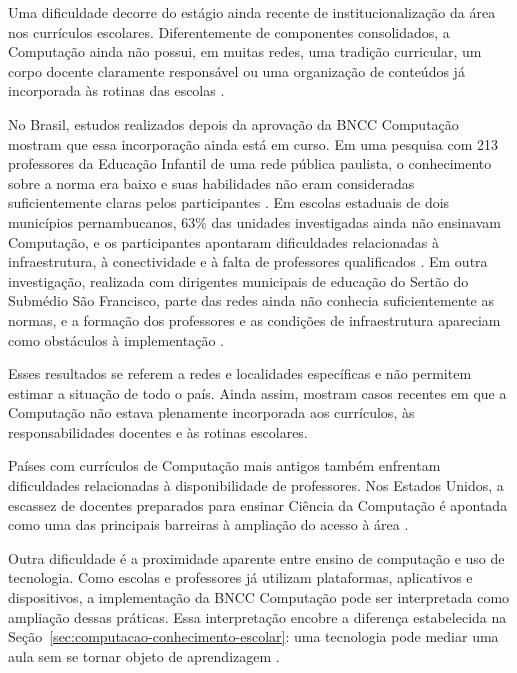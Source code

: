Uma dificuldade decorre do estágio ainda recente de institucionalização da área nos currículos escolares. Diferentemente de componentes consolidados, a Computação ainda não possui, em muitas redes, uma tradição curricular, um corpo docente claramente responsável ou uma organização de conteúdos já incorporada às rotinas das escolas \cite{royal2017afterreboot,palop2025redefining}.

No Brasil, estudos realizados depois da aprovação da BNCC Computação mostram que essa incorporação ainda está em curso. Em uma pesquisa com 213 professores da Educação Infantil de uma rede pública paulista, o conhecimento sobre a norma era baixo e suas habilidades não eram consideradas suficientemente claras pelos participantes \cite{guarda2024bnccinfantil}. Em escolas estaduais de dois municípios pernambucanos, 63\% das unidades investigadas ainda não ensinavam Computação, e os participantes apontaram dificuldades relacionadas à infraestrutura, à conectividade e à falta de professores qualificados \cite{oliveira2024ensinocomputacao}. Em outra investigação, realizada com dirigentes municipais de educação do Sertão do Submédio São Francisco, parte das redes ainda não conhecia suficientemente as normas, e a formação dos professores e as condições de infraestrutura apareciam como obstáculos à implementação \cite{souza2024implantacao}.

Esses resultados se referem a redes e localidades específicas e não permitem estimar a situação de todo o país. Ainda assim, mostram casos recentes em que a Computação não estava plenamente incorporada aos currículos, às responsabilidades docentes e às rotinas escolares.

Países com currículos de Computação mais antigos também enfrentam dificuldades relacionadas à disponibilidade de professores. Nos Estados Unidos, a escassez de docentes preparados para ensinar Ciência da Computação é apontada como uma das principais barreiras à ampliação do acesso à área \cite{hardin2026spark}.

Outra dificuldade é a proximidade aparente entre ensino de computação e uso de tecnologia. Como escolas e professores já utilizam plataformas, aplicativos e dispositivos, a implementação da BNCC Computação pode ser interpretada como ampliação dessas práticas. Essa interpretação encobre a diferença estabelecida na Seção~\ref{sec:computacao-conhecimento-escolar}: uma tecnologia pode mediar uma aula sem se tornar objeto de aprendizagem \cite{royal2017afterreboot,sadik2024understanding}.

